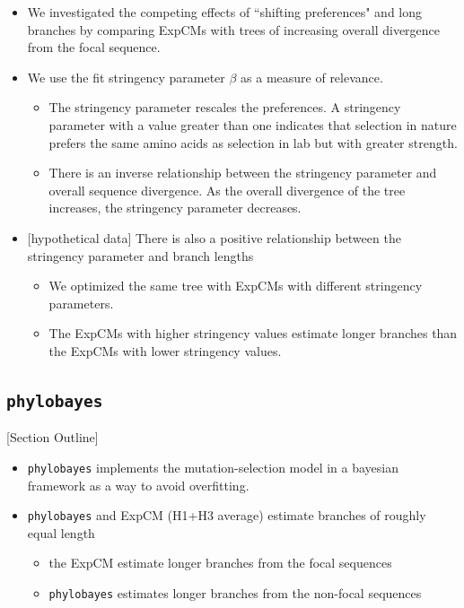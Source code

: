 \documentclass[11pt]{article}
\newcommand\skhcomment[1]{{\color{cyan}[#1]}}
\begin{document}
\begin{itemize}
\item We investigated the competing effects of ``shifting preferences" and long branches by comparing ExpCMs with trees of increasing overall divergence from the focal sequence. 
\item We use the fit stringency parameter $\beta$ as a measure of relevance. 
\begin{itemize}
\item The stringency parameter rescales the preferences. A stringency parameter with a value greater than one indicates that selection in nature prefers the same amino acids as selection in lab but with greater strength. 
\item There is an inverse relationship between the stringency parameter and overall sequence divergence. As the overall divergence of the tree increases, the stringency parameter decreases. 
\end{itemize}
\item \skhcomment{hypothetical data} There is also a positive relationship between the stringency parameter and branch lengths 
\begin{itemize}
\item We optimized the same tree with ExpCMs with different stringency parameters. 
\item The ExpCMs with higher stringency values estimate longer branches than the ExpCMs with lower stringency values. 
\end{itemize}
\end{itemize}

\subsection*{\texttt{phylobayes}}

\skhcomment{Section Outline}

\begin{itemize}
\item \texttt{phylobayes} implements the mutation-selection model in a bayesian framework as a way to avoid overfitting. 
\item \texttt{phylobayes} and ExpCM (H1+H3 average) estimate branches of roughly equal length 
\begin{itemize}
\item the ExpCM estimate longer branches from the focal sequences 
\item \texttt{phylobayes} estimates longer branches from the non-focal sequences 
\end{itemize}
\end{itemize}
\end{document}
